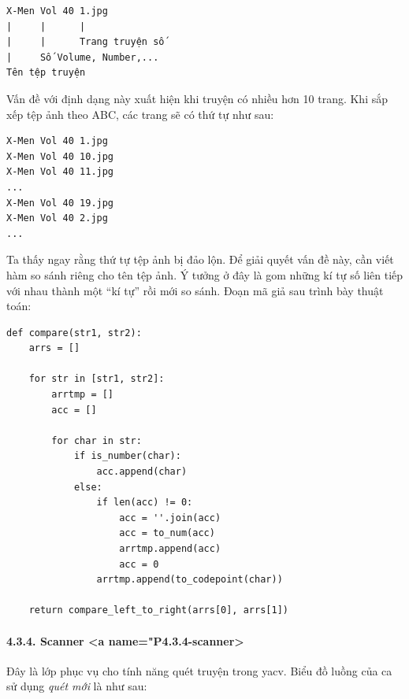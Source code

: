 \documentclass[
]{article}
\begin{document}
\begin{verbatim}
X-Men Vol 40 1.jpg
|     |      |
|     |      Trang truyện số
|     Số Volume, Number,...
Tên tệp truyện
\end{verbatim}

Vấn đề với định dạng này xuất hiện khi truyện có nhiều hơn 10 trang. Khi
sắp xếp tệp ảnh theo ABC, các trang sẽ có thứ tự như sau:

\begin{verbatim}
X-Men Vol 40 1.jpg
X-Men Vol 40 10.jpg
X-Men Vol 40 11.jpg
...
X-Men Vol 40 19.jpg
X-Men Vol 40 2.jpg
...
\end{verbatim}

Ta thấy ngay rằng thứ tự tệp ảnh bị đảo lộn. Để giải quyết vấn đề này,
cần viết hàm so sánh riêng cho tên tệp ảnh. Ý tưởng ở đây là gom những
kí tự số liên tiếp với nhau thành một ``kí tự'' rồi mới so sánh. Đoạn mã
giả sau trình bày thuật toán:

\begin{verbatim}
def compare(str1, str2):
    arrs = []

    for str in [str1, str2]:
        arrtmp = []
        acc = []

        for char in str:
            if is_number(char):
                acc.append(char)
            else:
                if len(acc) != 0:
                    acc = ''.join(acc)
                    acc = to_num(acc)
                    arrtmp.append(acc)
                    acc = 0
                arrtmp.append(to_codepoint(char))

    return compare_left_to_right(arrs[0], arrs[1])
\end{verbatim}

\hypertarget{scanner-a-namep4.3.4-scanner}{%
\paragraph{4.3.4. Scanner \textless a
name="P4.3.4-scanner\textgreater{}}\label{scanner-a-namep4.3.4-scanner}}

Đây là lớp phục vụ cho tính năng quét truyện trong yacv. Biểu đồ luồng
của ca sử dụng \emph{quét mới} là như sau:
\end{document}
